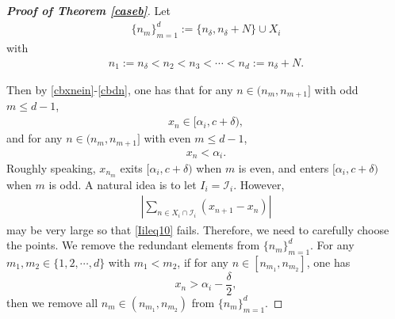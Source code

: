 \documentclass[12pt]{amsart}
\newcommand{\abs}[1]{\left\lvert #1 \right\rvert}
\theoremstyle{plain}
\theoremstyle{definition}
\begin{document}
\begin{proof}[\textbf{Proof of Theorem \ref{caseb}}]
 Let 
	\begin{align}
		\{n_m\}_{m=1}^d:=\{n_\delta,n_\delta+N\}\cup X_i\label{dnmcb}
	\end{align}
	with 
	\begin{align}
		n_1:=n_\delta<n_2<n_3<\cdots<n_d:=n_\delta+N.\label{cbdn}
	\end{align}
	
	Then by \eqref{cbxnein}-\eqref{cbdn}, one has that for any $n\in (n_m,n_{m+1}]$ with odd $m\leq d-1$,
	\begin{align}
		x_n\in [\alpha_i,c+{\delta}),\nonumber
	\end{align}
	and for any $n\in (n_m,n_{m+1}]$ with even $m\leq d-1$, 
	\begin{align}
		x_n<\alpha_i.\nonumber
	\end{align}
	Roughly speaking, $x_{n_m}$  exits $[\alpha_i,c+{\delta})$ when $m$ is even, and enters $[\alpha_i,c+{\delta})$ when $m$ is odd. A natural idea is to let $I_i=\mathcal{I}_i$. However,
	\begin{align}
		\abs{\sum_{n\in X_i\cap \mathcal{I}_i}(x_{n+1}-x_n)}\nonumber
	\end{align}
	may be very large so that \eqref{Iileq10} fails. Therefore, we need to carefully choose the points. 
	We remove the redundant elements from $\{n_m\}_{m=1}^d$. For any $m_1,m_2\in \{1,2,\cdots,d\}$ with $m_1<m_2$, if for any $n\in [n_{m_1},n_{m_2}]$, one has 
	$$x_n> \alpha_i-\frac{\delta}{2},$$
	then we remove all $n_m\in (n_{m_1},n_{m_2})$ from $\{n_m\}_{m=1}^d$.
	

\end{proof}
\end{document}
